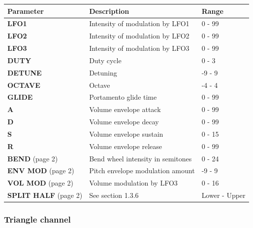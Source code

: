 \documentclass[a4paper, 12p]{extarticle}
\begin{document}
\begin{tabular}{l | l | l}
  Parameter & Description & Range\\ \hline
  \textbf{LFO1} & Intensity of modulation by LFO1 & 0 - 99\\
  \textbf{LFO2} & Intensity of modulation by LFO2 & 0 - 99\\
  \textbf{LFO3} & Intensity of modulation by LFO3 & 0 - 99\\
  \textbf{DUTY} & Duty cycle & 0 - 3\\
  \textbf{DETUNE} & Detuning & -9 - 9\\
  \textbf{OCTAVE} & Octave & -4 - 4\\
  \textbf{GLIDE} & Portamento glide time & 0 - 99\\
  \textbf{A} & Volume envelope attack & 0 - 99\\
  \textbf{D} & Volume envelope decay & 0 - 99\\
  \textbf{S} & Volume envelope sustain & 0 - 15\\
  \textbf{R} & Volume envelope release & 0 - 99\\
  \textbf{BEND} (page 2) & Bend wheel intensity in semitones & 0 - 24\\
  \textbf{ENV MOD} (page 2) & Pitch envelope modulation amount & -9 - 9\\
  \textbf{VOL MOD} (page 2) & Volume modulation by LFO3 & 0 - 16\\
  \textbf{SPLIT HALF} (page 2) & See section 1.3.6 & Lower - Upper\\
\end{tabular}

\subsubsection{Triangle channel}

\end{document}
